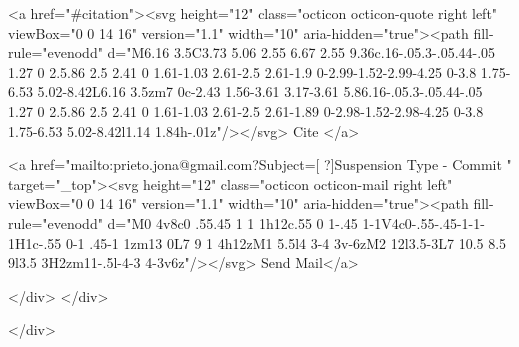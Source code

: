       <a  href="#citation"><svg height="12" class="octicon octicon-quote right left" viewBox="0 0 14 16" version="1.1" width="10" aria-hidden="true"><path fill-rule="evenodd" d="M6.16 3.5C3.73 5.06 2.55 6.67 2.55 9.36c.16-.05.3-.05.44-.05 1.27 0 2.5.86 2.5 2.41 0 1.61-1.03 2.61-2.5 2.61-1.9 0-2.99-1.52-2.99-4.25 0-3.8 1.75-6.53 5.02-8.42L6.16 3.5zm7 0c-2.43 1.56-3.61 3.17-3.61 5.86.16-.05.3-.05.44-.05 1.27 0 2.5.86 2.5 2.41 0 1.61-1.03 2.61-2.5 2.61-1.89 0-2.98-1.52-2.98-4.25 0-3.8 1.75-6.53 5.02-8.42l1.14 1.84h-.01z"/></svg> Cite
      </a>

      <a href="mailto:prieto.jona@gmail.com?Subject=[ ?]Suspension Type - Commit " target="_top"><svg height="12" class="octicon octicon-mail right left" viewBox="0 0 14 16" version="1.1" width="10" aria-hidden="true"><path fill-rule="evenodd" d="M0 4v8c0 .55.45 1 1 1h12c.55 0 1-.45 1-1V4c0-.55-.45-1-1-1H1c-.55 0-1 .45-1 1zm13 0L7 9 1 4h12zM1 5.5l4 3-4 3v-6zM2 12l3.5-3L7 10.5 8.5 9l3.5 3H2zm11-.5l-4-3 4-3v6z"/></svg> Send Mail</a>

    </div>
  </div>

</div>




